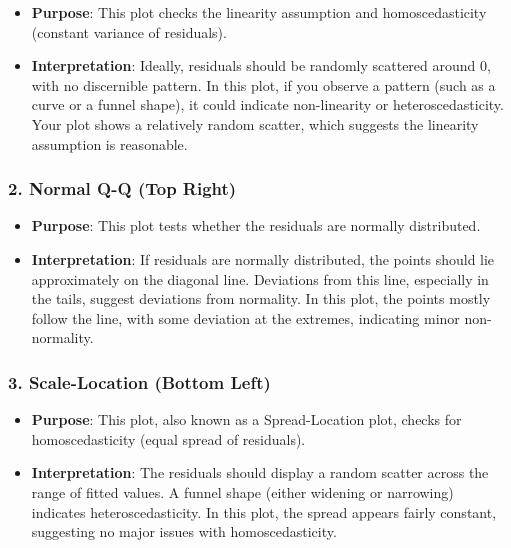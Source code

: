 \documentclass[
]{article}
\providecommand{\tightlist}{%
  \setlength{\itemsep}{0pt}\setlength{\parskip}{0pt}}
\begin{document}
\begin{itemize}
\tightlist
\item
  \textbf{Purpose}: This plot checks the linearity assumption and
  homoscedasticity (constant variance of residuals).
\item
  \textbf{Interpretation}: Ideally, residuals should be randomly
  scattered around 0, with no discernible pattern. In this plot, if you
  observe a pattern (such as a curve or a funnel shape), it could
  indicate non-linearity or heteroscedasticity. Your plot shows a
  relatively random scatter, which suggests the linearity assumption is
  reasonable.
\end{itemize}

\hypertarget{normal-q-q-top-right}{%
\subsubsection{\texorpdfstring{2. \textbf{Normal Q-Q (Top
Right)}}{2. Normal Q-Q (Top Right)}}\label{normal-q-q-top-right}}

\begin{itemize}
\tightlist
\item
  \textbf{Purpose}: This plot tests whether the residuals are normally
  distributed.
\item
  \textbf{Interpretation}: If residuals are normally distributed, the
  points should lie approximately on the diagonal line. Deviations from
  this line, especially in the tails, suggest deviations from normality.
  In this plot, the points mostly follow the line, with some deviation
  at the extremes, indicating minor non-normality.
\end{itemize}

\hypertarget{scale-location-bottom-left}{%
\subsubsection{\texorpdfstring{3. \textbf{Scale-Location (Bottom
Left)}}{3. Scale-Location (Bottom Left)}}\label{scale-location-bottom-left}}

\begin{itemize}
\tightlist
\item
  \textbf{Purpose}: This plot, also known as a Spread-Location plot,
  checks for homoscedasticity (equal spread of residuals).
\item
  \textbf{Interpretation}: The residuals should display a random scatter
  across the range of fitted values. A funnel shape (either widening or
  narrowing) indicates heteroscedasticity. In this plot, the spread
  appears fairly constant, suggesting no major issues with
  homoscedasticity.
\end{itemize}
\end{document}
